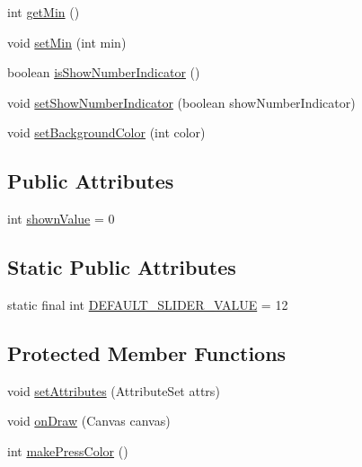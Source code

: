 \begin{DoxyCompactItemize}
\item 
int \hyperlink{classandroid_1_1app_1_1printerapp_1_1util_1_1ui_1_1_custom_editable_slider_a07e0f6ee3574ca35b55099582502db79}{get\+Min} ()
\item 
void \hyperlink{classandroid_1_1app_1_1printerapp_1_1util_1_1ui_1_1_custom_editable_slider_a3a31ea0de1e25ce6ef035560c97d9da9}{set\+Min} (int min)
\item 
boolean \hyperlink{classandroid_1_1app_1_1printerapp_1_1util_1_1ui_1_1_custom_editable_slider_abbeb6834edf2f80069b0fb4501e36a6d}{is\+Show\+Number\+Indicator} ()
\item 
void \hyperlink{classandroid_1_1app_1_1printerapp_1_1util_1_1ui_1_1_custom_editable_slider_ac2b2b45f6759729e4b852af00fa582c4}{set\+Show\+Number\+Indicator} (boolean show\+Number\+Indicator)
\item 
void \hyperlink{classandroid_1_1app_1_1printerapp_1_1util_1_1ui_1_1_custom_editable_slider_a94d166629fa40e1f1e50a566f208372f}{set\+Background\+Color} (int color)
\end{DoxyCompactItemize}
\subsection*{Public Attributes}
\begin{DoxyCompactItemize}
\item 
int \hyperlink{classandroid_1_1app_1_1printerapp_1_1util_1_1ui_1_1_custom_editable_slider_aee3f879880bdc320d68b241e31a7d64a}{shown\+Value} = 0
\end{DoxyCompactItemize}
\subsection*{Static Public Attributes}
\begin{DoxyCompactItemize}
\item 
static final int \hyperlink{classandroid_1_1app_1_1printerapp_1_1util_1_1ui_1_1_custom_editable_slider_afdb030fc0df3dcd89c729da5ab540a8c}{D\+E\+F\+A\+U\+L\+T\+\_\+\+S\+L\+I\+D\+E\+R\+\_\+\+V\+A\+L\+UE} = 12
\end{DoxyCompactItemize}
\subsection*{Protected Member Functions}
\begin{DoxyCompactItemize}
\item 
void \hyperlink{classandroid_1_1app_1_1printerapp_1_1util_1_1ui_1_1_custom_editable_slider_ac55e65df1f56df7e36d9f591c973783c}{set\+Attributes} (Attribute\+Set attrs)
\item 
void \hyperlink{classandroid_1_1app_1_1printerapp_1_1util_1_1ui_1_1_custom_editable_slider_ada0718136917c9cee4b001f8b6e736bd}{on\+Draw} (Canvas canvas)
\item 
int \hyperlink{classandroid_1_1app_1_1printerapp_1_1util_1_1ui_1_1_custom_editable_slider_a1c0f57a5906723b1cec017b9d788e569}{make\+Press\+Color} ()
\end{DoxyCompactItemize}


